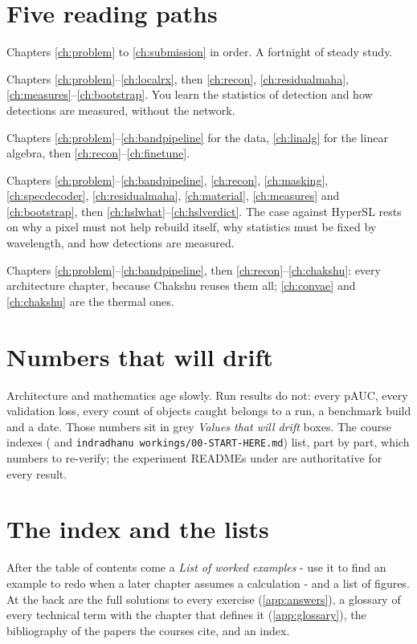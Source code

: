 \section*{Five reading paths}

\begin{description}[style=nextline,leftmargin=1.2em,font=\normalfont\bfseries]
  \item[The whole book (recommended).] Chapters \ref{ch:problem} to \ref{ch:submission} in order. A fortnight of
    steady study.
  \item[Detection only.] Chapters \ref{ch:problem}--\ref{ch:localrx}, then \ref{ch:recon}, \ref{ch:residualmaha},
    \ref{ch:measures}--\ref{ch:bootstrap}. You learn the statistics of detection and how detections are measured,
    without the network.
  \item[The network only.] Chapters \ref{ch:problem}--\ref{ch:bandpipeline} for the data, \ref{ch:linalg} for the
    linear algebra, then \ref{ch:recon}--\ref{ch:finetune}.
  \item[Why not an outside foundation model.] Chapters \ref{ch:problem}--\ref{ch:bandpipeline}, \ref{ch:recon},
    \ref{ch:masking}, \ref{ch:specdecoder}, \ref{ch:residualmaha}, \ref{ch:material}, \ref{ch:measures} and
    \ref{ch:bootstrap}, then \ref{ch:hslwhat}--\ref{ch:hslverdict}. The case against HyperSL rests on why a pixel must
    not help rebuild itself, why statistics must be fixed by wavelength, and how detections are measured.
  \item[The thermal models.] Chapters \ref{ch:problem}--\ref{ch:bandpipeline}, then \ref{ch:recon}--\ref{ch:chakshu}:
    every architecture chapter, because Chakshu reuses them all; \ref{ch:convae} and \ref{ch:chakshu} are the thermal
    ones.
\end{description}

\section*{Numbers that will drift}

Architecture and mathematics age slowly. Run results do not: every pAUC, every validation loss,
every count of objects caught belongs to a run, a benchmark build and a date. Those numbers sit in
grey \emph{Values that will drift} boxes. The course indexes
( and \texttt{indradhanu workings/00-START-HERE.md})
list, part by part, which numbers to re-verify; the experiment READMEs under
 are authoritative for every result.

\section*{The index and the lists}

After the table of contents come a \emph{List of worked examples} - use it to find an example to
redo when a later chapter assumes a calculation - and a list of figures. At the back are the full
solutions to every exercise (\cref{app:answers}), a glossary of every technical term with the
chapter that defines it (\cref{app:glossary}), the bibliography of the papers the courses cite, and
an index.
